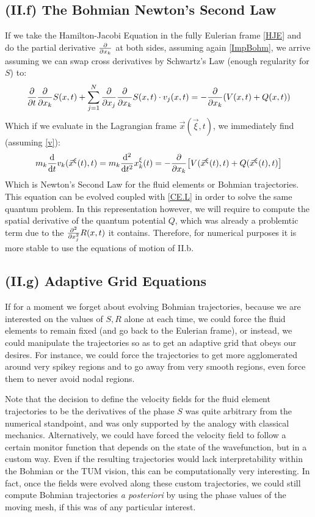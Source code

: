 \documentclass[11pt, a4paper]{article} %
\begin{document}
\subsection*{(II.f) The Bohmian Newton's Second Law}

If we take the Hamilton-Jacobi Equation in the fully Eulerian frame \eqref{HJE} and do the partial derivative $\pdv{}{x_k}$ at both sides, assuming again \eqref{ImpBohm}, we arrive assuming we can swap cross derivatives by Schwartz's Law (enough regularity for $S$) to:
\begin{equation}
\pdv{}{t}\pdv{}{x_k}S(x,t)+\sum_{j=1}^N\pdv{}{x_j}\pdv{}{x_k}S(x,t)\cdot v_j(x,t)=-\pdv{}{x_k}\qty(V(x,t)+Q(x,t))
\end{equation}
Which if we evaluate in the Lagrangian frame $\vec{x}(\vec{\xi},t)$, we immediately find (assuming \eqref{v}):
\begin{equation}
m_k\dv{}{t}v_k(\vec{x}^\xi(t),t)=m_k\dv[2]{}{t}x^\xi_k(t)=-\pdv{}{x_k}\qty[V(\vec{x}^\xi(t),t)+Q(\vec{x}^\xi(t),t) ]
\end{equation}
Which is Newton's Second Law for the fluid elements or Bohmian trajectories. This equation can be evolved coupled with \eqref{CE.L} in order to solve the same quantum problem. In this representation however, we will require to compute the spatial derivative of the quantum potential $Q$, which was already a problemtic term due to the $\pdv[2]{}{x_j}R(x,t)$ it contains. Therefore, for numerical purposes it is more stable to use the equations of motion of II.b.

\subsection*{(II.g) Adaptive Grid Equations}

If for a moment we forget about evolving Bohmian trajectories, because we are interested on the values of $S,R$ alone at each time, we could force the fluid elements to remain fixed (and go back to the Eulerian frame), or instead, we could manipulate the trajectories so as to get an adaptive grid that obeys our desires. For instance, we could force the trajectories to get more agglomerated around very spikey regions and to go away from very smooth regions, even force them to never avoid nodal regions.

Note that the decision to define the velocity fields for the fluid element trajectories to be the derivatives of the phase $S$ was quite arbitrary from the numerical standpoint, and was only supported by the analogy with classical mechanics. Alternatively, we could have forced the velocity field to follow a certain monitor function that depends on the state of the wavefunction, but in a custom way. Even if the resulting trajectories would lack interpretability within the Bohmian or the TUM vision, this can be computationally very interesting. In fact, once the fields were evolved along these custom trajectories, we could still compute Bohmian trajectories {\em a posteriori} by using the phase values of the moving mesh, if this was of any particular interest.
\end{document}

